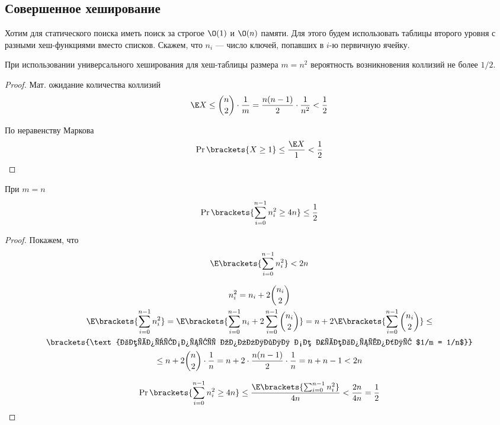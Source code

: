 \subsection{Совершенное хеширование}
Хотим для статического поиска иметь
поиск за строгое $\O(1)$
и $\O(n)$ памяти.
Для этого будем использовать таблицы второго уровня
с разными хеш-функциями вместо списков.
Скажем, что $n_i$ --- число ключей,
попавших в $i$-ю первичную ячейку.

\begin{theorem}
    \label{thm:06-1}
    При использовании универсального хеширования
    для хеш-таблицы размера $m = n^2$ вероятность
    возникновения коллизий не более $1/2$.
\end{theorem}
\begin{proof}
    Мат. ожидание количества коллизий
    \[
        \E X \le \binom{n}{2} \cdot \frac{1}{m}
        = \frac{n(n - 1)}{2} \cdot \frac{1}{n^2} < \frac{1}{2}
    \]

    По неравенству Маркова
    \[
        \Pr \brackets{X \geq 1} \le \frac{\E X}{1}
        < \frac{1}{2}
    \]
\end{proof}

\begin{theorem}
    \label{thm:06-2}
    При $m = n$
    \[
        \Pr \brackets{\sum_{i=0}^{n-1} n_i^2 \geq 4n} \le \frac{1}{2}
    \]
\end{theorem}
\begin{proof}
    Покажем, что
    \[
        \E \brackets{\sum_{i=0}^{n-1} n_i^2} < 2n
    \]

    \begin{gather*}
        n_i^2 = n_i + 2 \binom{n_i}{2} \\
        \E \brackets{\sum_{i=0}^{n-1} n_i^2}
        = \E \brackets{\sum_{i=0}^{n-1} n_i + 2 \sum_{i=0}^{n-1} \binom{n_i}{2}}
        = n + 2 \E \brackets{\sum_{i=0}^{n-1} \binom{n_i}{2}} \le \\
        \brackets{\text{вероятность коллизии не превосходит $1/m = 1/n$}} \\
        \le n + 2 \binom{n}{2} \cdot \frac{1}{n}
        = n + 2 \cdot \frac{n (n - 1)}{2} \cdot \frac{1}{n}
        = n + n - 1 < 2n
    \end{gather*}

    \[
        \Pr \brackets{\sum_{i=0}^{n-1} n_i^2 \geq 4n}
        \le \frac{\E \brackets{\sum_{i=0}^{n-1} n_i^2}}{4n}
        < \frac{2n}{4n} = \frac{1}{2}
    \]
\end{proof}

